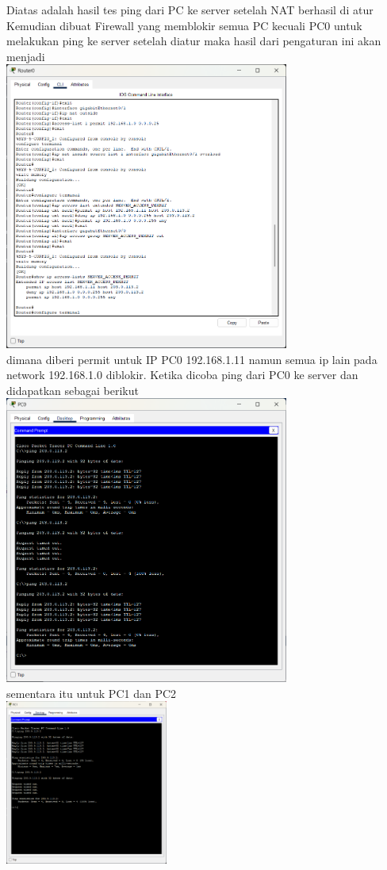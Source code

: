 Diatas adalah hasil tes ping dari PC ke server setelah NAT berhasil di atur
Kemudian dibuat Firewall yang memblokir semua PC kecuali PC0 untuk melakukan ping ke server
setelah diatur maka hasil dari pengaturan ini akan menjadi\\
\includegraphics[width=0.7\textwidth]{p4/img/Firewall.png}\\
dimana diberi permit untuk IP PC0 192.168.1.11 namun semua ip lain pada network 192.168.1.0 diblokir.
Ketika dicoba ping dari PC0 ke server dan didapatkan sebagai berikut\\
\includegraphics[width=0.7\textwidth]{p4/img/tumod4.png}\\
sementara itu untuk PC1 dan PC2\\
\includegraphics[width=0.4\textwidth]{p4/img/tumod5.png}
